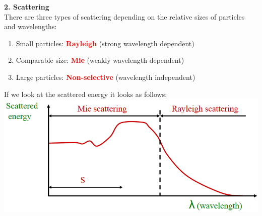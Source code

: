 \documentclass[a4paper, fontsize=8pt, landscape, DIV=1]{scrartcl}
\begin{document}
\begin{multicols*}{4}
		 \textbf{2. Scattering}\\
		 There are three types of scattering depending on the relative sizes of particles and wavelengths:
		 \begin{enumerate}[label=(\alph*)]
		 	\item Small particles: \textcolor{red}{\textbf{Rayleigh}} (strong wavelength dependent)
		 	\item Comparable size: \textcolor{red}{\textbf{Mie}} (weakly wavelength dependent)
		 	\item Large particles: \textcolor{red}{\textbf{Non-selective}} (wavelength independent)
		 \end{enumerate}
	 	If we look at the scattered energy it looks as follows:\\ 
	 	\includegraphics[width=\columnwidth]{images/Introduction/scattered_energy.png}
	 	

\end{multicols*}
\end{document}
